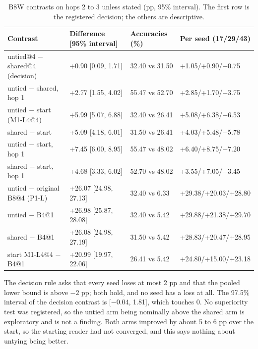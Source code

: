 \begin{table}[htbp]
\centering\footnotesize
\caption{B8W contrasts on hops 2 to 3 unless stated (pp, 95\% interval).  %
The first row is the registered decision; the others are descriptive.}
\label{tab:i-b8w}
\begin{tabular}{@{}W{330}{4}W{250}{4}W{190}{4}W{230}{4}@{}}
\toprule
Contrast & Difference [95\% interval] & Accuracies (\%) & Per seed (17/29/43) \\
\midrule
untied@4 $-$ shared@4 (decision) & +0.90 [0.09, 1.71] & 32.40 vs 31.50 & +1.05/+0.90/+0.75 \\ \addlinespace[3pt]
untied $-$ shared, hop 1 & +2.77 [1.55, 4.02] & 55.47 vs 52.70 & +2.85/+1.70/+3.75 \\ \addlinespace[3pt]
untied $-$ start (M1-L4@4) & +5.99 [5.07, 6.88] & 32.40 vs 26.41 & +5.08/+6.38/+6.53 \\ \addlinespace[3pt]
shared $-$ start & +5.09 [4.18, 6.01] & 31.50 vs 26.41 & +4.03/+5.48/+5.78 \\ \addlinespace[3pt]
untied $-$ start, hop 1 & +7.45 [6.00, 8.95] & 55.47 vs 48.02 & +6.40/+8.75/+7.20 \\ \addlinespace[3pt]
shared $-$ start, hop 1 & +4.68 [3.33, 6.02] & 52.70 vs 48.02 & +3.55/+7.05/+3.45 \\ \addlinespace[3pt]
untied $-$ original B8@4 (P1-L) & +26.07 [24.98, 27.13] & 32.40 vs 6.33 & +29.38/+20.03/+28.80 \\ \addlinespace[3pt]
untied $-$ B4@1 & +26.98 [25.87, 28.08] & 32.40 vs 5.42 & +29.88/+21.38/+29.70 \\ \addlinespace[3pt]
shared $-$ B4@1 & +26.08 [24.98, 27.19] & 31.50 vs 5.42 & +28.83/+20.47/+28.95 \\ \addlinespace[3pt]
start M1-L4@4 $-$ B4@1 & +20.99 [19.97, 22.06] & 26.41 vs 5.42 & +24.80/+15.00/+23.18 \\
\bottomrule
\end{tabular}
\end{table}

The decision rule asks that every seed loses at most 2 pp and that the pooled lower bound is above $-2$ pp; both hold, and no seed has a loss at all.  %
The 97.5\% interval of the decision contrast is [$-0.04$, 1.81], which touches 0.
No superiority test was registered, so the untied arm being nominally above the shared arm is exploratory and is not a finding.  %
Both arms improved by about 5 to 6 pp over the start, so the starting reader had not converged, and this says nothing about untying being better.  %

